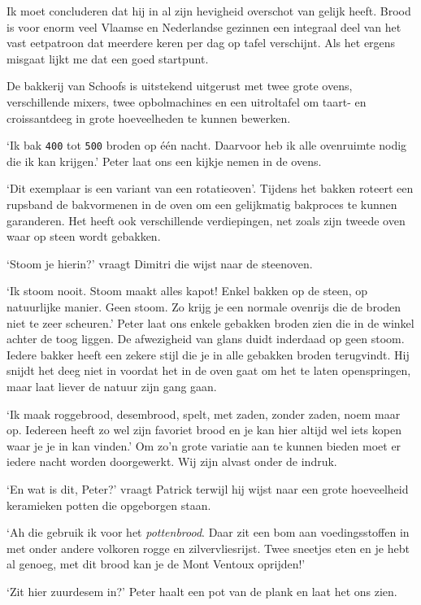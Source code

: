 \documentclass[
  11pt,
  dutch,
]{memoir}
\begin{document}
Ik moet concluderen dat hij in al zijn hevigheid overschot van gelijk
heeft. Brood is voor enorm veel Vlaamse en Nederlandse gezinnen een
integraal deel van het vast eetpatroon dat meerdere keren per dag op
tafel verschijnt. Als het ergens misgaat lijkt me dat een goed
startpunt.

De bakkerij van Schoofs is uitstekend uitgerust met twee grote ovens,
verschillende mixers, twee opbolmachines en een uitroltafel om taart- en
croissantdeeg in grote hoeveelheden te kunnen bewerken.

`Ik bak \texttt{400} tot \texttt{500} broden op één nacht. Daarvoor heb
ik alle ovenruimte nodig die ik kan krijgen.' Peter laat ons een kijkje
nemen in de ovens.

`Dit exemplaar is een variant van een rotatieoven'. Tijdens het bakken
roteert een rupsband de bakvormenen in de oven om een gelijkmatig
bakproces te kunnen garanderen. Het heeft ook verschillende
verdiepingen, net zoals zijn tweede oven waar op steen wordt gebakken.

`Stoom je hierin?' vraagt Dimitri die wijst naar de steenoven.

`Ik stoom nooit. Stoom maakt alles kapot! Enkel bakken op de steen, op
natuurlijke manier. Geen stoom. Zo krijg je een normale ovenrijs die de
broden niet te zeer scheuren.' Peter laat ons enkele gebakken broden
zien die in de winkel achter de toog liggen. De afwezigheid van glans
duidt inderdaad op geen stoom. Iedere bakker heeft een zekere stijl die
je in alle gebakken broden terugvindt. Hij snijdt het deeg niet in
voordat het in de oven gaat om het te laten openspringen, maar laat
liever de natuur zijn gang gaan.

`Ik maak roggebrood, desembrood, spelt, met zaden, zonder zaden, noem
maar op. Iedereen heeft zo wel zijn favoriet brood en je kan hier altijd
wel iets kopen waar je je in kan vinden.' Om zo'n grote variatie aan te
kunnen bieden moet er iedere nacht worden doorgewerkt. Wij zijn alvast
onder de indruk.

`En wat is dit, Peter?' vraagt Patrick terwijl hij wijst naar een grote
hoeveelheid keramieken potten die opgeborgen staan.

`Ah die gebruik ik voor het \emph{pottenbrood}. Daar zit een bom aan
voedingsstoffen in met onder andere volkoren rogge en zilvervliesrijst.
Twee sneetjes eten en je hebt al genoeg, met dit brood kan je de Mont
Ventoux oprijden!'

`Zit hier zuurdesem in?' Peter haalt een pot van de plank en laat het
ons zien.
\end{document}
